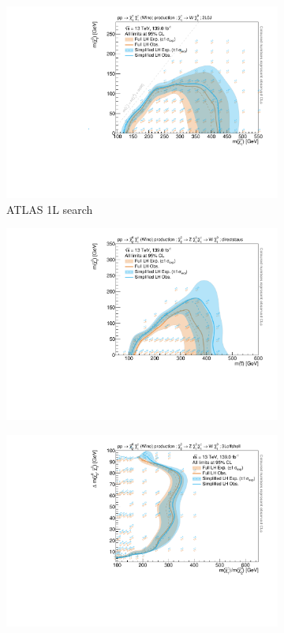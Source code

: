 \begin{figure}
\begin{subfigure}[b]{0.5\textwidth}
		\centering\includegraphics[width=\textwidth]{exclusion_2L0J_CLs_noLabel}
		\caption{ATLAS 1L search~\cite{SUSY-2019-08}}
	\end{subfigure}\hfill
	\begin{subfigure}[b]{0.5\textwidth}
		\centering\includegraphics[width=\textwidth]{exclusion_directstaus_CLs_noLabel}
		\caption{}
	\end{subfigure}\hfill
	\begin{subfigure}[b]{0.5\textwidth}
		\centering\includegraphics[width=\textwidth]{exclusion_3Loffshell_CLs_noLabel}

\end{subfigure}
\end{figure}
